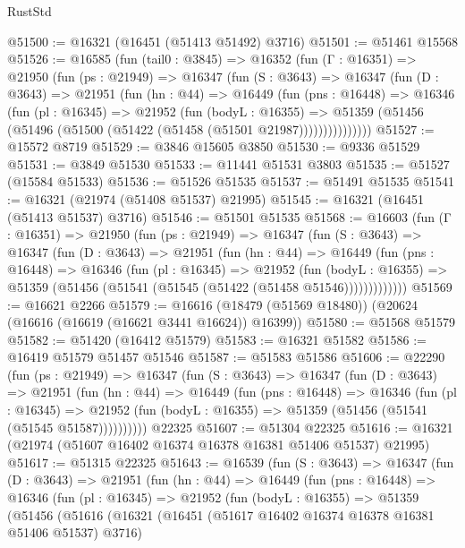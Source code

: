 \begin{lexlean}{RustStd}
\begin{coremodule}
@51500 := @16321 (@16451 (@51413 @51492) @3716)
@51501 := @51461 @15568
@51526 := @16585
    (fun (tail0 : @3845) =>
    @16352
      (fun (Γ : @16351) =>
      @21950
        (fun (ps : @21949) =>
        @16347
          (fun (S : @3643) =>
          @16347
            (fun (D : @3643) =>
            @21951
              (fun (hn : @44) =>
              @16449
                (fun (pns : @16448) =>
                @16346
                  (fun (pl : @16345) =>
                  @21952
                    (fun (bodyL : @16355) =>
                    @51359 (@51456 (@51496 (@51500 (@51422 (@51458 (@51501 @21987)))))))))))))))
@51527 := @15572 @8719
@51529 := @3846 @15605 @3850
@51530 := @9336 @51529
@51531 := @3849 @51530
@51533 := @11441 @51531 @3803
@51535 := @51527 (@15584 @51533)
@51536 := @51526 @51535
@51537 := @51491 @51535
@51541 := @16321 (@21974 (@51408 @51537) @21995)
@51545 := @16321 (@16451 (@51413 @51537) @3716)
@51546 := @51501 @51535
@51568 := @16603
    (fun (Γ : @16351) =>
    @21950
      (fun (ps : @21949) =>
      @16347
        (fun (S : @3643) =>
        @16347
          (fun (D : @3643) =>
          @21951
            (fun (hn : @44) =>
            @16449
              (fun (pns : @16448) =>
              @16346
                (fun (pl : @16345) =>
                @21952
                  (fun (bodyL : @16355) =>
                  @51359 (@51456 (@51541 (@51545 (@51422 (@51458 @51546)))))))))))))
@51569 := @16621 @2266
@51579 := @16616 (@18479 (@51569 @18480)) (@20624 (@16616 (@16619 (@16621 @3441 @16624)) @16399))
@51580 := @51568 @51579
@51582 := @51420 (@16412 @51579)
@51583 := @16321 @51582
@51586 := @16419 @51579 @51457 @51546
@51587 := @51583 @51586
@51606 := @22290
    (fun (ps : @21949) =>
    @16347
      (fun (S : @3643) =>
      @16347
        (fun (D : @3643) =>
        @21951
          (fun (hn : @44) =>
          @16449
            (fun (pns : @16448) =>
            @16346
              (fun (pl : @16345) =>
              @21952 (fun (bodyL : @16355) => @51359 (@51456 (@51541 (@51545 @51587))))))))))
    @22325
@51607 := @51304 @22325
@51616 := @16321 (@21974 (@51607 @16402 @16374 @16378 @16381 @51406 @51537) @21995)
@51617 := @51315 @22325
@51643 := @16539
    (fun (S : @3643) =>
    @16347
      (fun (D : @3643) =>
      @21951
        (fun (hn : @44) =>
        @16449
          (fun (pns : @16448) =>
          @16346
            (fun (pl : @16345) =>
            @21952
              (fun (bodyL : @16355) =>
              @51359
                (@51456
                  (@51616
                    (@16321
                      (@16451 (@51617 @16402 @16374 @16378 @16381 @51406 @51537) @3716)

\end{coremodule}
\end{lexlean}
